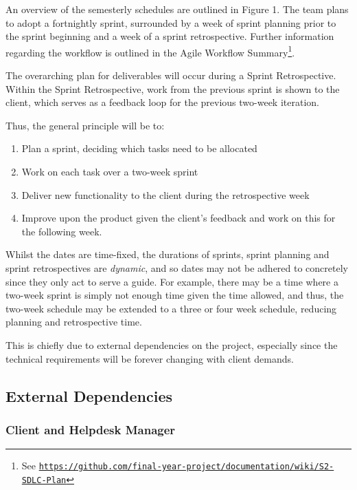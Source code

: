 \documentclass[12pt,a4paper,]{article}
\renewcommand{\href}[2]{#2\footnote{See \texttt{\url{#1}}}}
\providecommand{\tightlist}{%
  \setlength{\itemsep}{0pt}\setlength{\parskip}{0pt}}
\begin{document}
An overview of the semesterly schedules are outlined in Figure 1. The
team plans to adopt a fortnightly sprint, surrounded by a week of sprint
planning prior to the sprint beginning and a week of a sprint
retrospective. Further information regarding the workflow is outlined in
the
\href{https://github.com/final-year-project/documentation/wiki/S2-SDLC-Plan}{Agile
Workflow Summary}.

The overarching plan for deliverables will occur during a Sprint
Retrospective. Within the Sprint Retrospective, work from the previous
sprint is shown to the client, which serves as a feedback loop for the
previous two-week iteration.

Thus, the general principle will be to:

\begin{enumerate}
\def\labelenumi{\arabic{enumi}.}
\tightlist
\item
  Plan a sprint, deciding which tasks need to be allocated
\item
  Work on each task over a two-week sprint
\item
  Deliver new functionality to the client during the retrospective week
\item
  Improve upon the product given the client's feedback and work on this
  for the following week.
\end{enumerate}

Whilst the dates are time-fixed, the durations of sprints, sprint
planning and sprint retrospectives are \emph{dynamic}, and so dates may
not be adhered to concretely since they only act to serve a guide. For
example, there may be a time where a two-week sprint is simply not
enough time given the time allowed, and thus, the two-week schedule may
be extended to a three or four week schedule, reducing planning and
retrospective time.

This is chiefly due to external dependencies on the project, especially
since the technical requirements will be forever changing with client
demands.

\subsection{External Dependencies}\label{external-dependencies}

\subsubsection{Client and Helpdesk
Manager}\label{client-and-helpdesk-manager}
\end{document}
